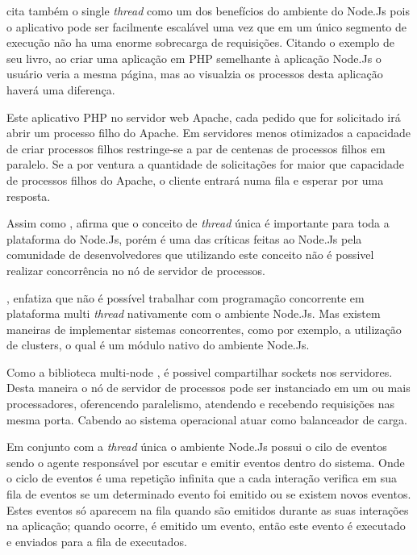   \cite{Powers:2012} cita também o single \textit{thread} como um dos benefícios do ambiente do Node.Js 
  pois o aplicativo pode ser facilmente escalável uma vez que em um único segmento de execução não ha uma enorme 
  sobrecarga de requisições. Citando o exemplo de seu livro, ao criar uma aplicação em \ac{PHP} semelhante 
  à aplicação Node.Js o usuário veria a mesma página, mas ao visualzia os processos desta aplicação haverá uma 
  diferença.
  
  Este aplicativo \ac{PHP} no servidor web Apache, cada pedido que for solicitado irá abrir um 
  processo filho do Apache. Em servidores menos otimizados a capacidade de criar processos filhos
  restringe-se a par de centenas de processos filhos em paralelo. Se a por ventura a quantidade de solicitações
  for maior que capacidade de processos filhos do Apache, o cliente entrará numa fila e esperar por uma resposta.\cite{Powers:2012}

  Assim como ,  afirma que o conceito de \textit{thread} única é importante para 
  toda a plataforma do Node.Js, porém é uma das críticas feitas ao Node.Js pela comunidade de desenvolvedores 
  que utilizando este conceito não é possivel realizar concorrência no nó de servidor de processos.
  
  , enfatiza que não é possível trabalhar com programação 
  concorrente em plataforma multi \textit{thread} nativamente com o ambiente Node.Js. Mas existem maneiras de implementar sistemas concorrentes, 
  como por exemplo, a utilização de clusters, o qual é um módulo nativo do ambiente Node.Js.
  
  Como a biblioteca  multi-node , é possivel compartilhar sockets nos servidores.
  Desta maneira o nó de servidor de processos pode ser instanciado em um ou mais processadores, oferencendo paralelismo, 
  atendendo e recebendo requisições nas mesma porta. Cabendo ao sistema operacional atuar como balanceador de carga.\cite{Oliveira:2012}
  
  Em conjunto com a \textit{thread} única o ambiente Node.Js possui o cilo de eventos sendo o agente responsável por escutar e 
  emitir eventos dentro do sistema. Onde o ciclo de eventos é uma repetição infinita que a cada interação verifica em sua 
  fila de eventos se um determinado evento foi emitido ou se existem novos eventos. Estes eventos só aparecem na 
  fila quando são emitidos durante as suas interações na aplicação; quando ocorre, é emitido um evento, então este evento 
  é executado e enviados para a fila de executados.\cite{Pereira:2013}
  
